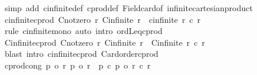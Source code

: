 \begin{isabellebody}
%
\isadelimproof
%
\endisadelimproof
%
\isatagproof
{}\isamarkupfalse%
\ {\isacharparenleft}{\kern0pt}simp\ add{\isacharcolon}{\kern0pt}\ cinfinite{\isacharunderscore}{\kern0pt}def\ cprod{\isacharunderscore}{\kern0pt}def\ Field{\isacharunderscore}{\kern0pt}card{\isacharunderscore}{\kern0pt}of\ infinite{\isacharunderscore}{\kern0pt}cartesian{\isacharunderscore}{\kern0pt}product{\isacharparenright}{\kern0pt}%
\endisatagproof
{\isafoldproof}%
%
\isadelimproof
\isanewline
%
\endisadelimproof
\isanewline
{}\isamarkupfalse%
\ cinfinite{\isacharunderscore}{\kern0pt}cprod{}{\isacharcolon}{\kern0pt}\ {\isachardoublequoteopen}{\isasymlbrakk}Cnotzero\ r{}{\isacharsemicolon}{\kern0pt}\ Cinfinite\ r{}{\isasymrbrakk}\ {\isasymLongrightarrow}\ cinfinite\ {\isacharparenleft}{\kern0pt}r{}\ {\isacharasterisk}{\kern0pt}c\ r{}{\isacharparenright}{\kern0pt}{\isachardoublequoteclose}\isanewline
%
\isadelimproof
%
\endisadelimproof
%
\isatagproof
{}\isamarkupfalse%
\ {\isacharparenleft}{\kern0pt}rule\ cinfinite{\isacharunderscore}{\kern0pt}mono{\isacharparenright}{\kern0pt}\ {\isacharparenleft}{\kern0pt}auto\ intro{\isacharcolon}{\kern0pt}\ ordLeq{\isacharunderscore}{\kern0pt}cprod{}{\isacharparenright}{\kern0pt}%
\endisatagproof
{\isafoldproof}%
%
\isadelimproof
\isanewline
%
\endisadelimproof
\isanewline
{}\isamarkupfalse%
\ Cinfinite{\isacharunderscore}{\kern0pt}cprod{}{\isacharcolon}{\kern0pt}\ {\isachardoublequoteopen}{\isasymlbrakk}Cnotzero\ r{}{\isacharsemicolon}{\kern0pt}\ Cinfinite\ r{}{\isasymrbrakk}\ {\isasymLongrightarrow}\ Cinfinite\ {\isacharparenleft}{\kern0pt}r{}\ {\isacharasterisk}{\kern0pt}c\ r{}{\isacharparenright}{\kern0pt}{\isachardoublequoteclose}\isanewline
%
\isadelimproof
%
\endisadelimproof
%
\isatagproof
{}\isamarkupfalse%
\ {\isacharparenleft}{\kern0pt}blast\ intro{\isacharcolon}{\kern0pt}\ cinfinite{\isacharunderscore}{\kern0pt}cprod{}\ Card{\isacharunderscore}{\kern0pt}order{\isacharunderscore}{\kern0pt}cprod{\isacharparenright}{\kern0pt}%
\endisatagproof
{\isafoldproof}%
%
\isadelimproof
\isanewline
%
\endisadelimproof
\isanewline
{}\isamarkupfalse%
\ cprod{\isacharunderscore}{\kern0pt}cong{\isacharcolon}{\kern0pt}\ {\isachardoublequoteopen}{\isasymlbrakk}p{}\ {\isacharequal}{\kern0pt}o\ r{}{\isacharsemicolon}{\kern0pt}\ p{}\ {\isacharequal}{\kern0pt}o\ r{}{\isasymrbrakk}\ {\isasymLongrightarrow}\ p{}\ {\isacharasterisk}{\kern0pt}c\ p{}\ {\isacharequal}{\kern0pt}o\ r{}\ {\isacharasterisk}{\kern0pt}c\ r{}{\isachardoublequoteclose}\isanewline

\end{isabellebody}

